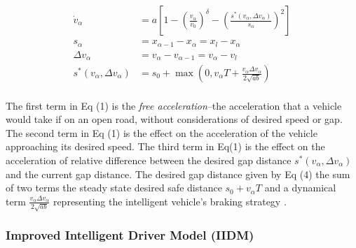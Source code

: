 \documentclass[12pt]{article}
\begin{document}
\begin{mymathbox}[ams gather, title=IDM Governing Equations, colframe=blue!30!black]
  \begin{align}
  \dot{v}_\alpha &= a \left[1 - \left(\frac{v_\alpha}{v_0}\right)^{\delta} - \left(\frac{s^*(v_\alpha,\Delta v_\alpha)}{s_\alpha}\right)^{2}\right]\\
  s_\alpha &= x_{\alpha-1}-x_\alpha=x_{l}-x_\alpha\\
  \Delta v_\alpha &=v_\alpha-v_{\alpha-1}=v_\alpha-v_l\\
  s^*(v_\alpha, \Delta v_\alpha) &= s_0 + \max\left(0, v_\alpha T + \frac{v_\alpha \Delta v_\alpha}{2 \sqrt{ab}} \right)
  \end{align}
\end{mymathbox}
\paragraph{}
The first term in Eq (1) is the \textit{free acceleration}\---the acceleration that a vehicle would take if on an open road, without considerations of desired speed or gap.  The second term in Eq (1) is the effect on the acceleration of the vehicle approaching its desired speed.  The third term in Eq(1) is the effect on the acceleration of relative difference between the desired gap distance $s^*(v_\alpha,\Delta v_\alpha)$ and the current gap distance.  The desired gap distance given by Eq (4) the sum of two terms the steady state desired safe distance $s_0+v_\alpha T$ and a dynamical term $\frac{v_\alpha \Delta v_\alpha}{2 \sqrt{ab}}$ representing the intelligent vehicle's braking strategy \cite{intelligent_driver_model}.

\subsubsection{Improved Intelligent Driver Model (IIDM)}
\end{document}
